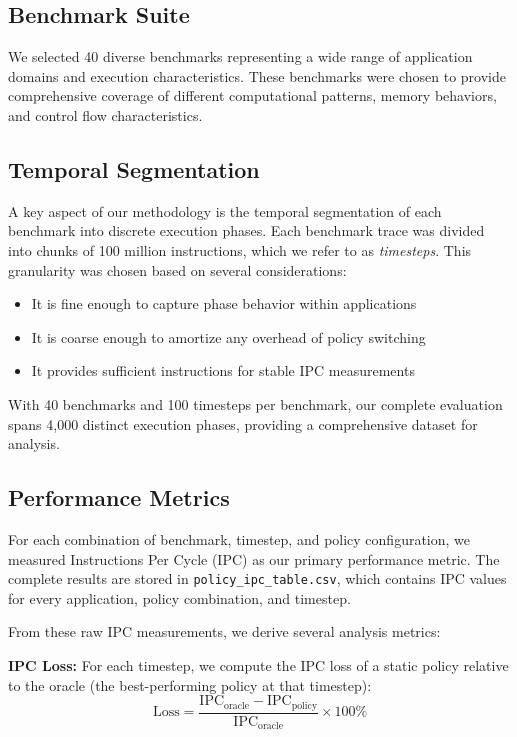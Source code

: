 \documentclass[conference]{IEEEtran}
\begin{document}
\subsection{Benchmark Suite}

We selected 40 diverse benchmarks representing a wide range of application domains and execution characteristics. These benchmarks were chosen to provide comprehensive coverage of different computational patterns, memory behaviors, and control flow characteristics.

\subsection{Temporal Segmentation}

A key aspect of our methodology is the temporal segmentation of each benchmark into discrete execution phases. Each benchmark trace was divided into chunks of 100 million instructions, which we refer to as \textit{timesteps}. This granularity was chosen based on several considerations:

\begin{itemize}
\item It is fine enough to capture phase behavior within applications
\item It is coarse enough to amortize any overhead of policy switching
\item It provides sufficient instructions for stable IPC measurements
\end{itemize}

With 40 benchmarks and 100 timesteps per benchmark, our complete evaluation spans 4,000 distinct execution phases, providing a comprehensive dataset for analysis.

\subsection{Performance Metrics}

For each combination of benchmark, timestep, and policy configuration, we measured Instructions Per Cycle (IPC) as our primary performance metric. The complete results are stored in \texttt{policy\_ipc\_table.csv}, which contains IPC values for every application, policy combination, and timestep.

From these raw IPC measurements, we derive several analysis metrics:

\textbf{IPC Loss:} For each timestep, we compute the IPC loss of a static policy relative to the oracle (the best-performing policy at that timestep):
\begin{equation}
\text{Loss} = \frac{\text{IPC}_{\text{oracle}} - \text{IPC}_{\text{policy}}}{\text{IPC}_{\text{oracle}}} \times 100\%
\end{equation}
\end{document}
